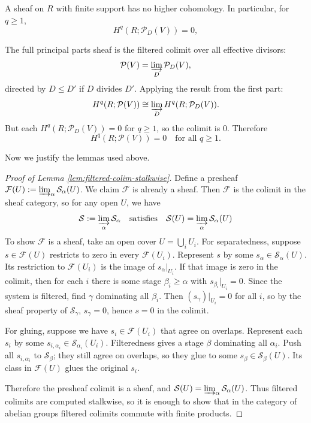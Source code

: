 \documentclass[12pt]{article}
\begin{document}
\begin{solution}
    \begin{lemma}\label{lem:finite-support-no-coh}
        A sheaf on $R$ with finite support has no higher cohomology. In particular, for $q\geq1$,
        \[
            H^q(R;\mathcal{P}_D(V)) = 0,
        \]
    \end{lemma}
    The full principal parts sheaf is the filtered colimit over all effective divisors:
    \[
        \mathcal{P}(V) = \varinjlim_D \mathcal{P}_D(V),
    \]
    directed by $D\leq D'$ if $D$ divides $D'$. Applying the result from the first part:
    \[
        H^q(R;\mathcal{P}(V)) \cong \varinjlim_D H^q(R;\mathcal{P}_D(V)).
    \]
    But each $H^q(R;\mathcal{P}_D(V))=0$ for $q\geq1$, so the colimit is 0. Therefore
    \[
        H^q(R;\mathcal{P}(V)) = 0 \quad \text{for all } q\geq1.
    \]

    Now we justify the lemmas used above.
    \begin{proof}[Proof of Lemma \ref{lem:filtered-colim-stalkwise}]
        Define a presheaf $\mathcal{F}(U) := \varinjlim_\alpha \mathcal{S}_\alpha(U)$. We claim $\mathcal{F}$ is already a sheaf. Then $\mathcal{F}$ is the colimit in the sheaf category, so for any open $U$, we have
        \[
            \mathcal{S} := \varinjlim_\alpha \mathcal{S}_\alpha \quad\text{satisfies}\quad \mathcal{S}(U) = \varinjlim_\alpha \mathcal{S}_\alpha(U)
        \]
        To show $\mathcal{F}$ is a sheaf, take an open cover $U = \bigcup_i U_i$. For separatedness, suppose $s \in \mathcal{F}(U)$ restricts to zero in every $\mathcal{F}(U_i)$. Represent $s$ by some $s_\alpha \in \mathcal{S}_\alpha(U)$. Its restriction to $\mathcal{F}(U_i)$ is the image of $s_\alpha|_{U_i}$. If that image is zero in the colimit, then for each $i$ there is some stage $\beta_i\geq\alpha$ with $s_{\beta_i}|_{U_i}=0$. Since the system is filtered, find $\gamma$ dominating all $\beta_i$. Then $(s_\gamma)|_{U_i}=0$ for all $i$, so by the sheaf property of $\mathcal{S}_\gamma$, $s_\gamma=0$, hence $s=0$ in the colimit.

        For gluing, suppose we have $s_i \in \mathcal{F}(U_i)$ that agree on overlaps. Represent each $s_i$ by some $s_{i,\alpha_i}\in \mathcal{S}_{\alpha_i}(U_i)$. Filteredness gives a stage $\beta$ dominating all $\alpha_i$. Push all $s_{i,\alpha_i}$ to $\mathcal{S}_\beta$; they still agree on overlaps, so they glue to some $s_\beta\in \mathcal{S}_\beta(U)$. Its class in $\mathcal{F}(U)$ glues the original $s_i$.

        Therefore the presheaf colimit is a sheaf, and $\mathcal{S}(U)=\varinjlim_\alpha \mathcal{S}_\alpha(U)$. Thus filtered colimits are computed stalkwise, so it is enough to show that in the category of abelian groups filtered colimits commute with finite products.
    \end{proof}


\end{solution}
\end{document}
